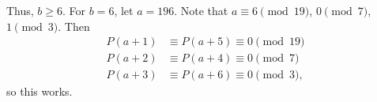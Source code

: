 Thus, $b\geq6$. For $b=6$, let $a=196$. Note that $a\equiv6\pmod{19}$, $0\pmod7$, $1\pmod3$. Then \begin{align*}P\left(a+1\right)&\equiv P\left(a+5\right)\equiv0\pmod{19}\\P\left(a+2\right)&\equiv P\left(a+4\right)\equiv0\pmod7\\P\left(a+3\right)&\equiv P\left(a+6\right)\equiv0\pmod3,\end{align*} so this works.